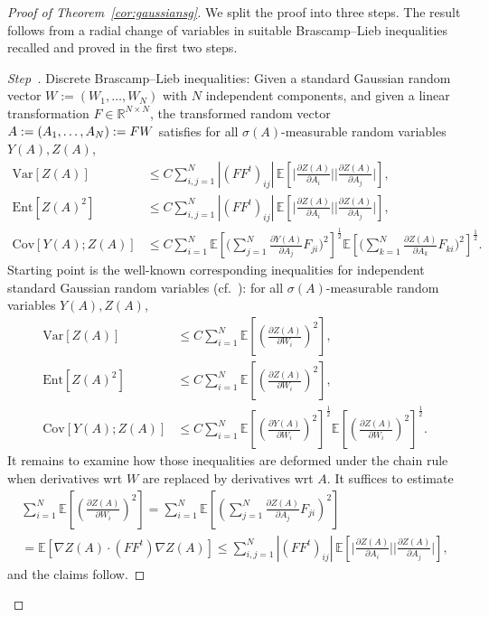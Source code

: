 \documentclass[AHL,Unicode,longabstracts]{cedram}
\newcommand{\R}{\mathbb R}
\newcommand{\E}{\mathbb{E}}
\newcommand{\expec}[1]{\mathbb{E}\left[#1 \right]}
\newcommand{\var}[1]{\mathrm{Var}\left[#1\right]}
\newcommand{\ent}[1]{\mathrm{Ent}\!\left[#1\right]}
\newcommand{\cov}[2]{\mathrm{Cov}\left[#1;#2\right]}
\newcounter{stepcount}
\newenvironment{step}{\refstepcounter{stepcount}\begin{proof}[Step~\thestepcount]}{\let\qed\relax\end{proof}}
\begin{document}
\begin{proof}[Proof of Theorem~\ref{cor:gaussiansg}]
We split the proof into three steps. The result follows from a radial change of variables in suitable Brascamp--Lieb inequalities recalled and proved in the first two steps.


\setcounter{stepcount}{0}
\begin{step}{Discrete Brascamp--Lieb inequalities:}\label{step1prooftheo3.1}
Given a standard Gaussian random vector $W:=(W_1,\ldots,W_N)$ with $N$ independent components, and given a linear transformation $F\in\R^{N\times N}$, the transformed random vector $A:=(A_1,\ldots,A_N)\linebreak:=FW$ satisfies for all $\sigma(A)$-measurable random variables $Y(A),Z(A)$,
\begin{equation}\label{eq:bl-var-disr}
\begin{aligned}
\var{Z(A)} &\le C\sum_{i,j=1}^N|(FF^t)_{ij}|\,\expec{\Big|\frac{\partial Z(A)}{\partial A_i}\Big|\Big|\frac{\partial Z(A)}{\partial A_j}\Big|},
\\
\ent{Z(A)^2} &\le C\sum_{i,j=1}^N|(FF^t)_{ij}|\,\expec{\Big|\frac{\partial Z(A)}{\partial A_i}\Big|\Big|\frac{\partial Z(A)}{\partial A_j}\Big|},\\
\cov{Y(A)}{Z(A)} &\le  C\sum_{i=1}^N\expec{\Big(\sum_{j=1}^N\frac{\partial{Y(A)}}{\partial A_j}F_{ji}\Big)^2}^\frac12\!\expec{\Big(\sum_{k=1}^N\frac{\partial{Z(A)}}{\partial A_k}F_{ki}\Big)^2}^\frac12.
\end{aligned}
\end{equation}
Starting point is the well-known corresponding inequalities for independent standard Gaussian random variables (cf.~\cite{Gross-75}): for all $\sigma(A)$-measurable random variables $Y(A),Z(A)$,
\begin{align*}
\var{Z(A)} &\le C\sum_{i=1}^N\expec{\left(\frac{\partial Z(A)}{\partial W_i}\right)^2},
\\
\ent{Z(A)^2} &\le C\sum_{i=1}^N\expec{\left(\frac{\partial Z(A)}{\partial W_i}\right)^2},
\\
\cov{Y(A)}{Z(A)} &\le C\sum_{i=1}^N\expec{\left(\frac{\partial{Y(A)}}{\partial W_i}\right)^2}^\frac12\!\expec{\left(\frac{\partial{Z(A)}}{\partial W_i}\right)^2}^\frac12.
\end{align*}
It remains to examine how those inequalities are deformed under the chain rule when derivatives wrt $W$ are replaced by derivatives wrt $A$. It suffices to estimate
\begin{multline*}
\sum_{i=1}^N\expec{\left(\frac{\partial{Z(A)}}{\partial W_i}\right)^2} = \sum_{i=1}^N\E\left[{\left(\sum_{j=1}^N\frac{\partial{Z(A)}}{\partial A_j}F_{ji} \right)^2}\right]\\
=\expec{\nabla Z(A)\cdot (FF^t)\nabla Z(A)} 
\le \sum_{i,j=1}^N|(FF^t)_{ij}|\,\expec{\Big|\frac{\partial{Z(A)}}{\partial A_i}\Big|\Big|\frac{\partial{Z(A)}}{\partial A_j}\Big|},
\end{multline*}
and the claims follow.
\end{step}


\end{proof}
\end{document}
